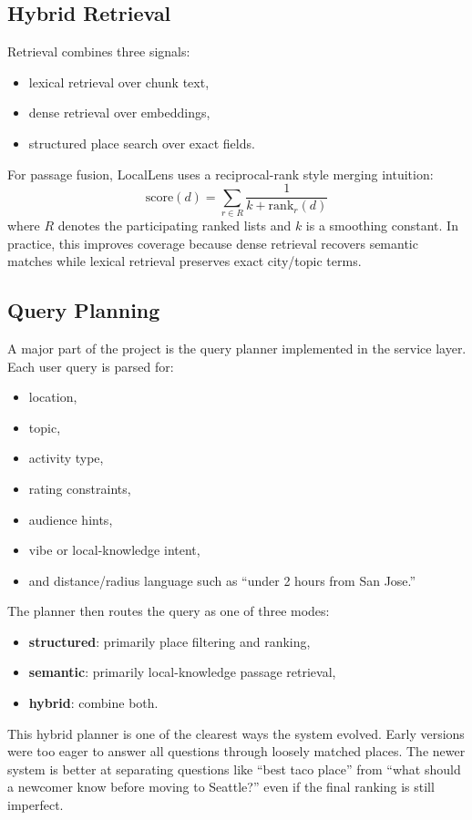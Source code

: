 \documentclass[11pt]{article}
\begin{document}
\subsection{Hybrid Retrieval}
Retrieval combines three signals:
\begin{itemize}[leftmargin=*]
    \item lexical retrieval over chunk text,
    \item dense retrieval over embeddings,
    \item structured place search over exact fields.
\end{itemize}

For passage fusion, LocalLens uses a reciprocal-rank style merging intuition:
\[
\mathrm{score}(d) = \sum_{r \in R} \frac{1}{k + \mathrm{rank}_r(d)}
\]
where $R$ denotes the participating ranked lists and $k$ is a smoothing constant. In practice, this improves coverage because dense retrieval recovers semantic matches while lexical retrieval preserves exact city/topic terms.

\subsection{Query Planning}
A major part of the project is the query planner implemented in the service layer. Each user query is parsed for:
\begin{itemize}[leftmargin=*]
    \item location,
    \item topic,
    \item activity type,
    \item rating constraints,
    \item audience hints,
    \item vibe or local-knowledge intent,
    \item and distance/radius language such as ``under 2 hours from San Jose.''
\end{itemize}

The planner then routes the query as one of three modes:
\begin{itemize}[leftmargin=*]
    \item \textbf{structured}: primarily place filtering and ranking,
    \item \textbf{semantic}: primarily local-knowledge passage retrieval,
    \item \textbf{hybrid}: combine both.
\end{itemize}

This hybrid planner is one of the clearest ways the system evolved. Early versions were too eager to answer all questions through loosely matched places. The newer system is better at separating questions like ``best taco place'' from ``what should a newcomer know before moving to Seattle?'' even if the final ranking is still imperfect.
\end{document}
